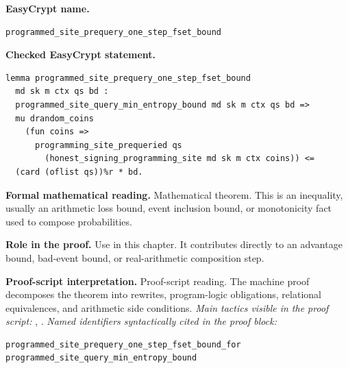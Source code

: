 \begin{formaltheorem}
\noindent\textbf{EasyCrypt name.}
\begin{lstlisting}[language=EasyCrypt,basicstyle=\ttfamily\scriptsize]
programmed_site_prequery_one_step_fset_bound
\end{lstlisting}
\noindent\textbf{Checked EasyCrypt statement.}
\begin{lstlisting}[language=EasyCrypt,basicstyle=\ttfamily\scriptsize]
lemma programmed_site_prequery_one_step_fset_bound
  md sk m ctx qs bd :
  programmed_site_query_min_entropy_bound md sk m ctx qs bd =>
  mu drandom_coins
    (fun coins =>
      programming_site_prequeried qs
        (honest_signing_programming_site md sk m ctx coins)) <=
  (card (oflist qs))%r * bd.
\end{lstlisting}
\noindent\textbf{Formal mathematical reading.}
Mathematical theorem. This is an inequality, usually an arithmetic loss bound, event inclusion bound, or monotonicity fact used to compose probabilities.

\noindent\textbf{Role in the proof.}
Use in this chapter. It contributes directly to an advantage bound, bad-event bound, or real-arithmetic composition step.

\noindent\textbf{Proof-script interpretation.}
Proof-script reading. The machine proof decomposes the theorem into rewrites, program-logic obligations, relational equivalences, and arithmetic side conditions.
\emph{Main tactics visible in the proof script:} , .
\emph{Named identifiers syntactically cited in the proof block:}
\begin{lstlisting}[language=EasyCrypt,basicstyle=\ttfamily\scriptsize]
programmed_site_prequery_one_step_fset_bound_for
programmed_site_query_min_entropy_bound
\end{lstlisting}

\end{formaltheorem}

